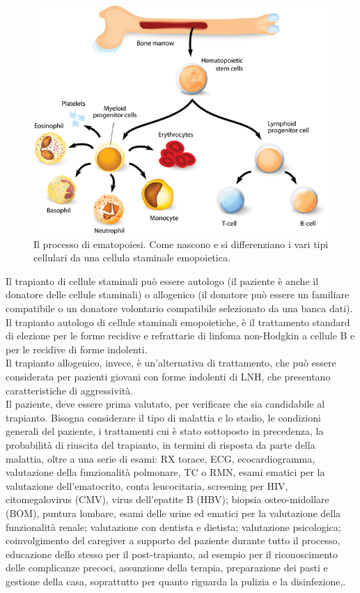\begin{figure}[H]
    \begin{center}
    \includegraphics[width=0.5\columnwidth]{img/transplant.jpeg}
    \vspace{-3mm}
    \end{center}
    \caption{Il processo di ematopoiesi. Come nascono e si differenziano i vari tipi cellulari da una cellula staminale 
    emopoietica.
    \cite{img35}}
    \label{fig:FIGURE_3.14}
\end{figure}

Il trapianto di cellule staminali può essere autologo (il paziente è anche il donatore delle cellule staminali) 
o allogenico (il donatore può essere un familiare compatibile o un donatore volontario compatibile selezionato da una 
banca dati)\cite{LLS}.\\
Il trapianto autologo di cellule staminali emopoietiche, è il trattamento standard di elezione per le forme recidive e 
refrattarie di linfoma non-Hodgkin a cellule B e per le recidive di forme indolenti\cite{TRANS}.\\ 
Il trapianto allogenico, invece, è un’alternativa di trattamento, che può essere considerata per pazienti giovani con forme 
indolenti di LNH, che presentano caratteristiche di aggressività\cite{LLS}.\\
Il paziente, deve essere prima valutato, per verificare che sia candidabile al trapianto. 
Bisogna considerare il tipo di malattia e lo stadio, le condizioni generali del paziente, i trattamenti cui è stato 
sottoposto in precedenza, la probabilità di riuscita del trapianto, in termini di risposta da parte della malattia, 
oltre a una serie di esami: RX torace, ECG, ecocardiogramma, valutazione della funzionalità polmonare, TC o RMN, 
esami ematici per la valutazione dell’ematocrito, conta leucocitaria, screening per HIV, citomegalovirus (CMV), 
virus dell’epatite B (HBV); biopsia osteo-midollare (BOM), puntura lombare, esami delle urine ed ematici per la 
valutazione della funzionalità renale; valutazione con dentista e dietista; valutazione psicologica; 
coinvolgimento del caregiver a supporto del paziente durante tutto il processo, educazione dello stesso per il 
post-trapianto, ad esempio per il riconoscimento delle complicanze precoci, assunzione della terapia, preparazione 
dei pasti e gestione della casa, soprattutto per quanto riguarda la pulizia e la disinfezione\cite{LLS},\cite{STEMCELLS}.

